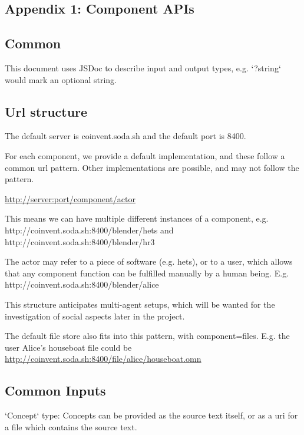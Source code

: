 \documentclass[10pt]{article}
\begin{document}
\begin{appendices}
\section{Appendix 1: Component APIs}

\subsection{Common}

This document uses JSDoc to describe input and output types, e.g. `{?string}` would mark an optional string.

\subsection{Url structure}

The default server is coinvent.soda.sh and the default port is 8400.

For each component, we provide a default implementation, and these follow a
common url pattern.
Other implementations are possible, and may not follow the pattern.

	\url{http://server:port/component/actor}

This means we can have multiple different instances of a component, e.g.
http://coinvent.soda.sh:8400/blender/hets and http://coinvent.soda.sh:8400/blender/hr3

The actor may refer to a piece of software (e.g. hets), or to a user, which allows that any component function can be fulfilled manually by a human being. E.g. http://coinvent.soda.sh:8400/blender/alice

This structure anticipates multi-agent setups, which will be wanted for the 
investigation of social aspects later in the project.

The default file store also fits into this pattern, with component=files. 
E.g. the user Alice's houseboat file could be 
\url{http://coinvent.soda.sh:8400/file/alice/houseboat.omn}


\subsection{Common Inputs}

`Concept` type: Concepts can be provided as the source text itself, or as a uri for a file which contains the source text.


\end{appendices}
\end{document}
